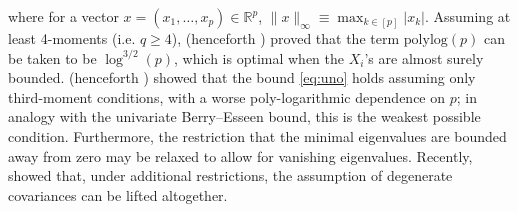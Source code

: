 \documentclass[aos]{imsart}
\begin{document}
where for a vector $x = (x_1,\ldots, x_p) \in \mathbb{R}^p$, $\| x \|_\infty \equiv \max_{k \in [p]}|x_k|$.  Assuming at least 4-moments (i.e. $q \geq 4$),  \cite{chernozhukov2020nearly} (henceforth ) proved that the term $\mathrm{polylog}(p)$ can be taken to be  $\log^{3/2}(p)$, which is optimal when the $X_i$'s are almost surely bounded. \cite{kuchibhotla2020high} (henceforth ) showed that the bound \eqref{eq:uno} holds assuming only third-moment conditions, with a worse poly-logarithmic dependence on $p$; in analogy with the univariate Berry--Esseen bound, this is the weakest possible condition. Furthermore, the restriction that the minimal eigenvalues are bounded away from zero may be relaxed to allow for vanishing eigenvalues. Recently, \cite{koike.degenerate} showed that, under additional restrictions, the assumption of degenerate covariances can be lifted altogether.
\end{document}
